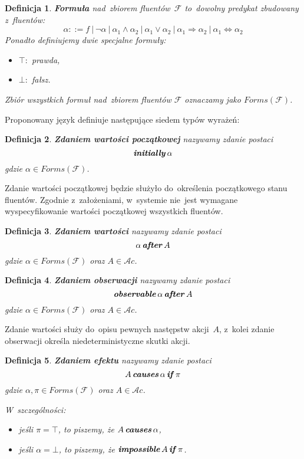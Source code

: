 \documentclass[11pt,a4paper]{article}
\newtheorem{defn}{Definicja}
\DeclareMathOperator{\Initially}{\textbf{\textit{initially}}}
\DeclareMathOperator{\After}{\textbf{\textit{after}}}
\DeclareMathOperator{\Observable}{\textbf{\textit{observable}}}
\DeclareMathOperator{\Causes}{\textbf{\textit{causes}}}
\DeclareMathOperator{\If}{\textbf{\textit{if}}}
\DeclareMathOperator{\Impossible}{\textbf{\textit{impossible}}}
\begin{document}
\begin{defn}
    \textbf{Formuła} nad~zbiorem fluentów~$\mathcal{F}$ to~dowolny predykat zbudowany z~fluentów: 
    $$ \alpha ::= f\ |\ \neg\alpha\ |\ \alpha_1 \land \alpha_2\ |\ \alpha_1 \lor \alpha_2\ |\ \alpha_1 \Rightarrow \alpha_2\ |\ \alpha_1 \Leftrightarrow \alpha_2 $$
    Ponadto definiujemy dwie specjalne formuły:
    
    \begin{itemize}
    \item $\top\colon$ prawda,
    
    \item $\bot\colon$ fałsz.
    \end{itemize}
    
    Zbiór wszystkich formuł nad~zbiorem fluentów $\mathcal{F}$ oznaczamy jako $Forms(\mathcal{F})$.
\end{defn}

Proponowany język definiuje następujące siedem typów wyrażeń:

\begin{defn}
    \textbf{Zdaniem wartości początkowej} nazywamy zdanie postaci
    $$ \Initially \alpha $$
    gdzie $\alpha \in Forms(\mathcal{F})$.
\end{defn}

Zdanie wartości początkowej będzie służyło do~określenia początkowego stanu fluentów.
Zgodnie z~założeniami, w~systemie nie~jest wymagane wyspecyfikowanie wartości początkowej wszystkich fluentów.

\begin{defn}
    \textbf{Zdaniem wartości} nazywamy zdanie postaci
    $$ \alpha \After A $$
    gdzie $\alpha \in Forms(\mathcal{F})$ oraz $A \in \mathcal{A}c$.
\end{defn}

\begin{defn}
    \textbf{Zdaniem obserwacji} nazywamy zdanie postaci
    $$ \Observable \alpha \After A $$
    gdzie $\alpha \in Forms(\mathcal{F})$ oraz $A \in \mathcal{A}c$.
\end{defn}

Zdanie wartości służy do~opisu pewnych następstw akcji~$A$, z~kolei zdanie obserwacji określa niedeterministyczne skutki akcji.

\begin{defn}
    \textbf{Zdaniem efektu} nazywamy zdanie postaci
    $$A \Causes \alpha \If \pi$$
    gdzie $\alpha, \pi \in Forms(\mathcal{F})$ oraz $A \in \mathcal{A}c$.

    W~szczególności:
    \begin{itemize}
        \item jeśli $\pi = \top$, to piszemy, że $A \Causes \alpha$,
        \item jeśli $\alpha = \bot$, to piszemy, że $\Impossible A \If \pi$.
    \end{itemize}
\end{defn}
\end{document}

